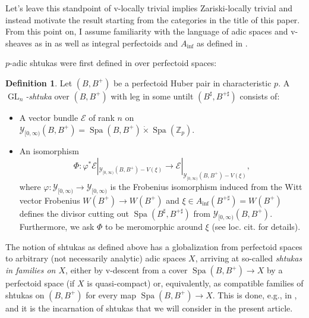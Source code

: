 \documentclass[10pt,twoside]{article}
\numberwithin{equation}{section}
\theoremstyle{plain}
\theoremstyle{definition}
\newtheorem{mydef}[mythm]{Definition}
\DeclareMathOperator{\Spa}{Spa}
\DeclareMathOperator{\GL}{GL}
\newcommand{\ZZ}{\mathbb{Z}}
\newcommand{\MCE}{\mathcal{E}}
\newcommand{\MCY}{\mathcal{Y}}
\let \phi \varphi
\DeclareMathOperator{\Inf}{inf}
\newcommand{\Ainf}{A_{\Inf}}
\newcommand{\Yco}{\MCY_{[0,\infty)}}
\begin{document}
Let's leave this standpoint of v-locally trivial implies Zariski-locally trivial and instead motivate the result starting from the categories in the title of this paper. From this point on, I assume familiarity with the language of adic spaces and v-sheaves as in \cite{SW20} as well as integral perfectoids and \(\Ainf\) as defined in \cite[Section 3.1-3.2]{BMS19}.\par
\(p\)-adic shtukas were first defined in \cite[11.4.1]{SW20} over perfectoid spaces:
\begin{mydef}
Let \((B,B^+)\) be a perfectoid Huber pair in characteristic \(p\). A \(\GL_n\)\emph{-shtuka} over \((B,B^+)\) with leg in some untilt \((B^\sharp, B^{+\sharp})\) consists of:
\begin{itemize}
	\item A vector bundle \(\MCE\) of rank \(n\) on \(\Yco(B,B^+)=\Spa(B,B^+)\dot\times \Spa(\ZZ_p)\).
	\item An isomorphism 
    \[\Phi\colon\phi^*\MCE|_{\Yco(B,B^+)-V(\xi)}\longrightarrow \MCE|_{\Yco(B,B^+)-V(\xi)},\]
    where \(\phi\colon \Yco\to\Yco\) is the Frobenius isomorphism induced from the Witt vector Frobenius \(W(B^+)\to W(B^+)\) and \(\xi\in \Ainf(B^{+\sharp})=W(B^+)\) defines the divisor cutting out \(\Spa(B^\sharp,B^{+\sharp})\) from \(\Yco(B,B^+)\). Furthermore, we ask \(\Phi\) to be meromorphic around \(\xi\) (see loc. cit. for details).
\end{itemize}
\end{mydef}
The notion of shtukas as defined above has a globalization from perfectoid spaces to arbitrary (not necessarily analytic) adic spaces \(X\), arriving at so-called \emph{shtukas in families on \(X\)}, either by v-descent from a cover \(\Spa(B,B^+)\to X\) by a perfectoid space (if \(X\) is quasi-compact) or, equivalently, as compatible families of shtukas on \((B,B^+)\) for every map \(\Spa(B,B^+)\to X\). This is done, e.g., in \cite{PR}, and it is the incarnation of shtukas that we will consider in the present article.
\end{document}
